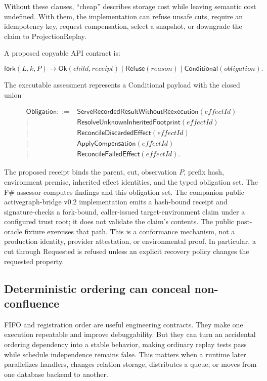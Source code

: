 Without these clauses, ``cheap'' describes storage cost while leaving semantic
cost undefined.  With them, the implementation can refuse unsafe cuts, require
an idempotency key, request compensation, select a snapshot, or downgrade the
claim to ProjectionReplay.

A proposed copyable API contract is:

\begin{equation}
\mathsf{fork}(L,k,P) \rightarrow
\mathsf{Ok}(child,receipt)\;|\;
\mathsf{Refuse}(reason)\;|\;
\mathsf{Conditional}(obligation).
\end{equation}

The executable assessment represents a Conditional payload with the closed
union

\begin{align}
\mathsf{Obligation} ::= {}&
  \mathsf{ServeRecordedResultWithoutReexecution}(effectId) \\
  \mid{}& \mathsf{ResolveUnknownInheritedFootprint}(effectId) \\
  \mid{}& \mathsf{ReconcileDiscardedEffect}(effectId) \\
  \mid{}& \mathsf{ApplyCompensation}(effectId) \\
  \mid{}& \mathsf{ReconcileFailedEffect}(effectId).
\end{align}

The proposed receipt binds the parent, cut, observation $P$, prefix hash,
environment premise, inherited effect identities, and the typed obligation
set.  The F\# assessor computes findings and this obligation set.  The companion
public activegraph-bridge v0.2 implementation emits a hash-bound
receipt and signature-checks a fork-bound, caller-issued target-environment
claim under a configured trust root; it does not validate the claim's contents.
The public post-oracle fixture exercises that path.  This is a conformance
mechanism, not a production identity, provider attestation, or environmental
proof.  In particular, a cut through Requested is refused unless an explicit
recovery policy changes the requested property.

\subsection{Deterministic ordering can conceal non-confluence}

FIFO and registration order are useful engineering contracts.  They make one
execution repeatable and improve debuggability.  But they can turn an accidental
ordering dependency into a stable behavior, making ordinary replay tests pass
while schedule independence remains false.  This matters when a runtime later
parallelizes handlers, changes relation storage, distributes a queue, or moves
from one database backend to another.

